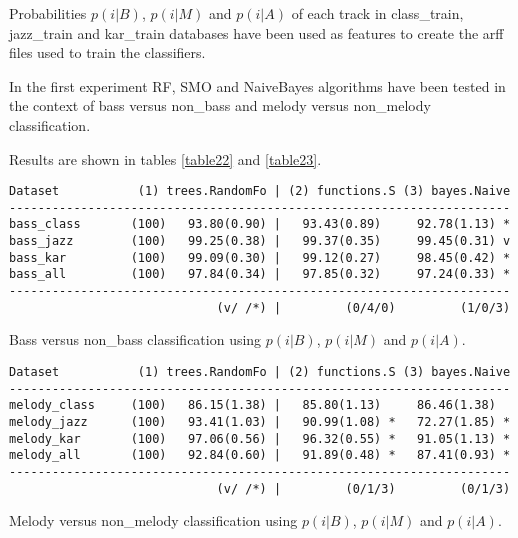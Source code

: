 \documentclass{article}
\begin{document}
Probabilities $p(i|B)$, $p(i|M)$ and $p(i|A)$ of each track in class\_train, jazz\_train and kar\_train databases have been used as features to create the arff files used to train the classifiers.

In the first experiment RF, SMO and NaiveBayes algorithms have been tested in the context of bass versus non\_bass and melody versus non\_melody classification. 

Results are shown in  tables \ref{table22} and \ref{table23}.

\begin{table}
\small
\begin{center}
\begin{verbatim}
Dataset           (1) trees.RandomFo | (2) functions.S (3) bayes.Naive 
---------------------------------------------------------------------- 
bass_class       (100)   93.80(0.90) |   93.43(0.89)     92.78(1.13) * 
bass_jazz        (100)   99.25(0.38) |   99.37(0.35)     99.45(0.31) v 
bass_kar         (100)   99.09(0.30) |   99.12(0.27)     98.45(0.42) * 
bass_all         (100)   97.84(0.34) |   97.85(0.32)     97.24(0.33) * 
---------------------------------------------------------------------- 
                             (v/ /*) |         (0/4/0)         (1/0/3) 
\end{verbatim}
\caption{Bass versus non\_bass classification using $p(i|B)$, $p(i|M)$ and $p(i|A)$.}
\label{table22}
\end{center}
\end{table}

\begin{table}
\small
\begin{center}
\begin{verbatim}
Dataset           (1) trees.RandomFo | (2) functions.S (3) bayes.Naive
----------------------------------------------------------------------
melody_class     (100)   86.15(1.38) |   85.80(1.13)     86.46(1.38)  
melody_jazz      (100)   93.41(1.03) |   90.99(1.08) *   72.27(1.85) *
melody_kar       (100)   97.06(0.56) |   96.32(0.55) *   91.05(1.13) *
melody_all       (100)   92.84(0.60) |   91.89(0.48) *   87.41(0.93) *
----------------------------------------------------------------------
                             (v/ /*) |         (0/1/3)         (0/1/3)

\end{verbatim}
\caption{Melody versus non\_melody classification using $p(i|B)$, $p(i|M)$ and $p(i|A)$.}
\label{table23}
\end{center}
\end{table}
\end{document}
